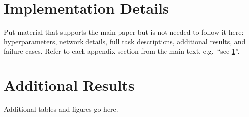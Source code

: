 \beginappendix

\section{Implementation Details}
\label{app:implementation}

Put material that supports the main paper but is not needed to follow it here: hyperparameters, network details, full task descriptions, additional results, and failure cases. Refer to each appendix section from the main text, e.g.\ ``see \cref{app:implementation}''.

\section{Additional Results}
\label{app:results}

Additional tables and figures go here.
